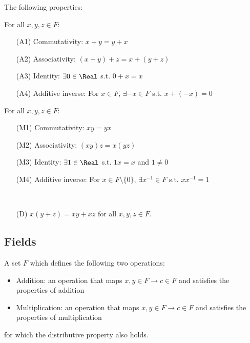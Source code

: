 \begin{definition}
  The following properties:

\begin{theorem}
  For all $x, y, z \in F$:
  \begin{itemize}
    \item[(A1)] Commutativity: $x + y = y + x$ 
    \item[(A2)] Associativity: $(x + y) + z = x + (y + z)$
    \item[(A3)] Identity: $\exists 0 \in \Real$ s.t. $0 + x = x$
    \item[(A4)] Additive inverse: For $x \in F$, $\exists -x \in F$ s.t. $x + (-x) = 0$
  \end{itemize}
\end{theorem}

\begin{theorem}
  For all $x, y, z \in F$:
  \begin{itemize}
    \item[(M1)] Commutativity: $xy = yx$ 
    \item[(M2)] Associativity: $(xy)z = x(yz)$
    \item[(M3)] Identity: $\exists 1 \in \Real$ s.t. $1x = x$ and $1 \neq 0$
    \item[(M4)] Additive inverse: For $x \in F \setminus \{ 0 \}$, $\exists x^{-1} \in F$ s.t. $xx^{-1} = 1$
  \end{itemize}
\end{theorem}

\begin{theorem} \ \\
  \begin{itemize}
    \item[(D)] $x(y + z) = xy + xz$ for all $x, y, z \in F$.
  \end{itemize}
\end{theorem}
\end{definition}

\subsection{Fields}

\begin{definition}[Field]
  A set $F$ which defines the following two operations:
  \begin{itemize}
    \item Addition: an operation that maps $x, y \in F \to c \in F$ and satisfies the properties of addition
    \item Multiplication: an operation that maps $x, y \in F \to c \in F$ and satisfies the properties of multiplication
  \end{itemize}
  for which the distributive property also holds.
\end{definition}

